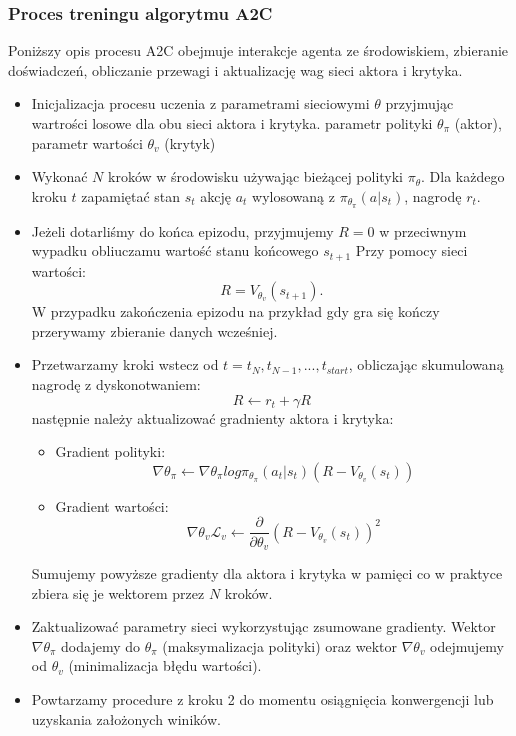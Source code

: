 \documentclass[a4paper, 12pt]{article}
\begin{document}
    \subsubsection{Proces treningu algorytmu A2C}
    Poniższy opis procesu A2C obejmuje interakcje agenta ze środowiskiem, zbieranie doświadczeń, obliczanie przewagi i aktualizację wag sieci aktora i krytyka.
    \begin{itemize}
        \item Inicjalizacja procesu uczenia z parametrami sieciowymi \( \theta \) przyjmując wartrości losowe dla obu sieci aktora i krytyka.
        parametr polityki \( \theta_\pi \) (aktor), parametr wartości \( \theta_v \) (krytyk)
        \item Wykonać \( N \) kroków w środowisku używając bieżącej polityki \( \pi_\theta \). Dla każdego kroku
        \( t \) zapamiętać stan \( s_t \) akcję \( a_t \) wylosowaną z \( \pi_{\theta_\pi} (a|s_t) \), nagrodę \( r_t \).
        \item Jeżeli dotarliśmy do końca epizodu, przyjmujemy \( R = 0 \) w przeciwnym wypadku obliuczamu wartość stanu końcowego \( s_{t+1} \)
        Przy pomocy sieci wartości:
        \[ R = V_{\theta_v}(s_{t+1}). \]
        W przypadku zakończenia epizodu na przykład gdy gra się kończy przerywamy zbieranie danych wcześniej.
        \item Przetwarzamy kroki wstecz od \( t = t_N, t_{N-1}, ..., t_{start} \), obliczając skumulowaną nagrodę z dyskonotwaniem:
        \[ R \leftarrow r_t + \gamma R \]
        następnie należy aktualizować gradnienty aktora i krytyka:
        \begin{itemize}
            \item Gradient polityki:
            \[ \nabla \theta_\pi \leftarrow \nabla \theta_\pi log \pi_{\theta_\pi} (a_t|s_t) (R-V_{\theta_v}(s_t)) \]
            \item Gradient wartości:
            \[ \nabla \theta_v \mathcal{L}_v \leftarrow \frac{\partial}{\partial \theta_v} (R - V_{\theta_v}(s_t))^2 \]
        \end{itemize}
        Sumujemy powyższe gradienty dla aktora i krytyka w pamięci co w praktyce zbiera się je wektorem przez \( N \) kroków.
        \item Zaktualizować parametry sieci wykorzystując zsumowane gradienty. Wektor \( \nabla \theta_\pi \) dodajemy do \( \theta_\pi \) (maksymalizacja polityki) oraz
        wektor \( \nabla \theta_v \) odejmujemy od \( \theta_v \) (minimalizacja błędu wartości).
        \item Powtarzamy procedure z kroku 2 do momentu osiągnięcia konwergencji lub uzyskania założonych winików.
    \end{itemize}
\end{document}
